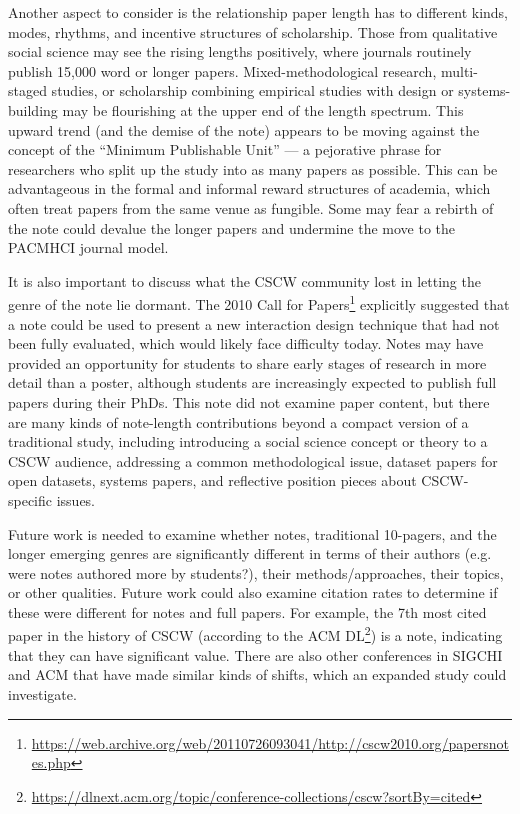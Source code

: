 \documentclass[format=acmsmall, screen=true]{acmart}
\begin{document}
Another aspect to consider is the relationship paper length has to different kinds, modes, rhythms, and incentive structures of scholarship. Those from qualitative social science may see the rising lengths positively, where journals routinely publish 15,000 word or longer papers. Mixed-methodological research, multi-staged studies, or scholarship combining empirical studies with design or systems-building may be flourishing at the upper end of the length spectrum. This upward trend (and the demise of the note) appears to be moving against the concept of the ``Minimum Publishable Unit'' --- a pejorative phrase for researchers who split up the study into as many papers as possible. This can be advantageous in the formal and informal reward structures of academia, which often treat papers from the same venue as fungible. Some may fear a rebirth of the note could devalue the longer papers and undermine the move to the PACMHCI journal model.

It is also important to discuss what the CSCW community lost in letting the genre of the note lie dormant. The 2010 Call for Papers\footnote{\url{https://web.archive.org/web/20110726093041/http://cscw2010.org/papersnotes.php}} explicitly suggested that a note could be used to present a new interaction design technique that had not been fully evaluated, which would likely face difficulty today. Notes may have provided an opportunity for students to share early stages of research in more detail than a poster, although students are increasingly expected to publish full papers during their PhDs. This note did not examine paper content, but there are many kinds of note-length contributions beyond a compact version of a traditional study, including introducing a social science concept or theory to a CSCW audience, addressing a common methodological issue, dataset papers for open datasets, systems papers, and reflective position pieces about CSCW-specific issues. 

Future work is needed to examine whether notes, traditional 10-pagers, and the longer emerging genres are significantly different in terms of their authors (e.g. were notes authored more by students?), their methods/approaches, their topics, or other qualities. Future work could also examine citation rates to determine if these were different for notes and full papers. For example, the 7th most cited paper in the history of CSCW (according to the ACM DL\footnote{\url{https://dlnext.acm.org/topic/conference-collections/cscw?sortBy=cited}}) is a note, indicating that they can have significant value. There are also other conferences in SIGCHI and ACM that have made similar kinds of shifts, which an expanded study could investigate.
\end{document}
